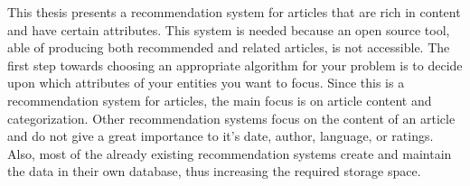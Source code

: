 
This thesis presents a recommendation system for articles that are rich in content and have certain attributes. This system is needed because an open source tool, able of producing both recommended and related articles, is not accessible. The first step towards choosing an appropriate algorithm for your problem is to decide upon which attributes of your entities you want to focus. Since this is a recommendation system for articles, the main focus is on article content and categorization. Other recommendation systems focus on the content of an article and do not give a great importance to it's date, author, language, or ratings. Also, most of the already existing recommendation systems create and maintain the data in their own database, thus increasing the required storage space.